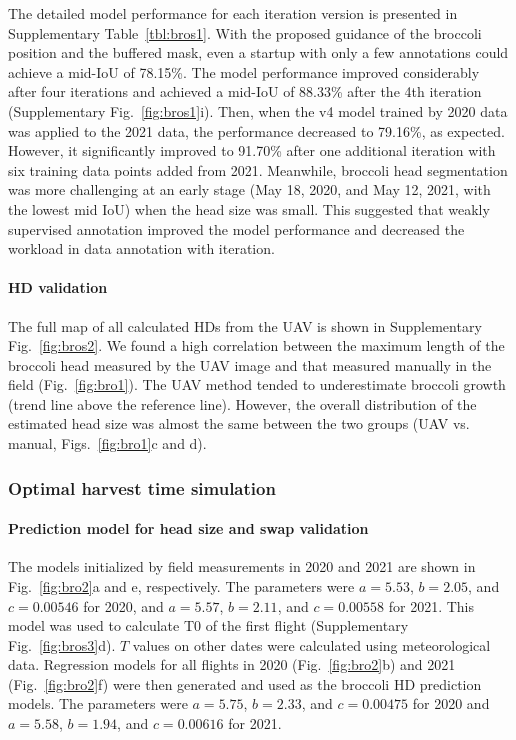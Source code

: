 The detailed model performance for each iteration version is presented in Supplementary Table~\ref{tbl:bros1}. With the proposed guidance of the broccoli position and the buffered mask, even a startup with only a few annotations could achieve a mid-IoU of 78.15\%. The model performance improved considerably after four iterations and achieved a mid-IoU of 88.33\% after the 4th iteration (Supplementary Fig.~\ref{fig:bros1}i). Then, when the v4 model trained by 2020 data was applied to the 2021 data, the performance decreased to 79.16\%, as expected. However, it significantly improved to 91.70\% after one additional iteration with six training data points added from 2021. Meanwhile, broccoli head segmentation was more challenging at an early stage (May 18, 2020, and May 12, 2021, with the lowest mid IoU) when the head size was small. This suggested that weakly supervised annotation improved the model performance and decreased the workload in data annotation with iteration.

\paragraph{HD validation}

The full map of all calculated HDs from the UAV is shown in Supplementary Fig.~\ref{fig:bros2}. We found a high correlation between the maximum length of the broccoli head measured by the UAV image and that measured manually in the field (Fig.~\ref{fig:bro1}). The UAV method tended to underestimate broccoli growth (trend line above the reference line). However, the overall distribution of the estimated head size was almost the same between the two groups (UAV vs. manual, Figs.~\ref{fig:bro1}c and d). 




\subsubsection{Optimal harvest time simulation}

\paragraph{Prediction model for head size and swap validation}

The models initialized by field measurements in 2020 and 2021 are shown in Fig.~\ref{fig:bro2}a and e, respectively. The parameters were $a = 5.53$, $b = 2.05$, and $c = 0.00546$ for 2020, and $a = 5.57$, $b = 2.11$, and $c = 0.00558$ for 2021. This model was used to calculate T0 of the first flight (Supplementary Fig.~\ref{fig:bros3}d). $T$ values on other dates were calculated using meteorological data. Regression models for all flights in 2020 (Fig.~\ref{fig:bro2}b) and 2021 (Fig.~\ref{fig:bro2}f) were then generated and used as the broccoli HD prediction models. The parameters were $a = 5.75$, $b = 2.33$, and $c = 0.00475$ for 2020 and $a = 5.58$, $b = 1.94$, and $c = 0.00616$ for 2021.

